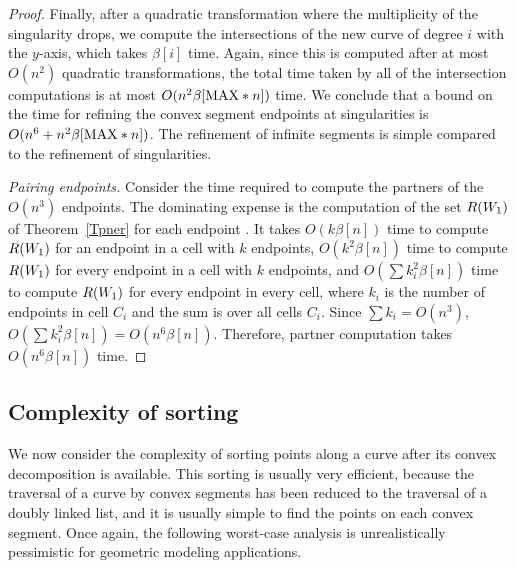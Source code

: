 \begin{proof}
Finally, after a quadratic transformation where the multiplicity of the 
singularity 
drops, we compute the intersections of the new curve of degree $i$ with 
the $y$-axis, 
which takes $\beta[i]$ time.
Again, since this is computed after at most $O(n^{2})$ quadratic 
transformations,
the total time taken by all of the intersection computations is at most 
$O(n^{2} \beta[{\rm MAX} * n])$ time.
We conclude that a bound on the time for refining the
convex segment endpoints at singularities is 
$O(n^{6} + n^{2} \beta[{\rm MAX} * n])$.
The refinement of infinite segments is simple compared to the refinement 
of singularities.

{\em Pairing endpoints.}
%
Consider the time required to compute the partners of the $O(n^{3})$ 
endpoints.
The dominating expense is the computation of the set $R(\mbox{$W_{1}$})$ of 
Theorem~\ref{Tpner} for each endpoint \wo.
It takes $O(k\beta[n])$ time to compute $R(\mbox{$W_{1}$})$ for an endpoint in a cell
with $k$ endpoints, $O(k^{2}\beta[n])$ time to compute $R(\mbox{$W_{1}$})$ for every 
endpoint in a cell with $k$ endpoints, and $O(\sum k_{i}^{2}\beta[n])$
time to compute $R(\mbox{$W_{1}$})$ for every endpoint in every cell, where $k_{i}$ 
is the
number of endpoints in cell $C_{i}$ and the sum is over all cells $C_{i}$.
Since $\sum k_{i} = O(n^{3})$, 
$O(\sum k_{i}^{2}\beta[n]) = O(n^{6}\beta[n])$.
Therefore, partner computation takes $O(n^{6}\beta[n])$ time.
\end{proof}

\subsection{Complexity of sorting}

We now consider the complexity of sorting points along a curve after its 
convex
decomposition is available.
This sorting is usually very efficient, because the traversal of a curve by
convex segments has been reduced to the traversal of a doubly linked 
list, and
it is usually simple to find the points on each convex segment.
Once again, the following worst-case analysis is unrealistically pessimistic
for geometric modeling applications.

